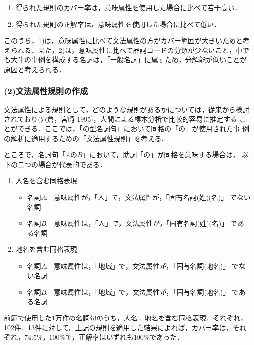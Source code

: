\begin{enumerate}
 \item 得られた規則のカバー率は，意味属性を使用した場合に比べて若干高い．
 \item 得られた規則の正解率は，意味属性を使用した場合に比べて低い．
\end{enumerate}\vspace{\baselineskip}

このうち，1)は，意味属性に比べて文法属性の方がカバー範囲が大きいためと考
えられる．また，2)は，意味属性に比べて品詞コードの分類が少ないこと，中で
も大半の事例を構成する名詞は，「一般名詞」に属すため，分解能が低いことが
原因と考えられる．
\subsubsection*{(2)文法属性規則の作成}

文法属性による規則として，どのような規則があるかについては，従来から検討
されており(穴倉，宮崎 1995)，人間による標本分析で比較的容易に推定する
ことができる．ここでは，「の型名詞句」において同格の「の」が使用された事
例の解析に適用するための「文法属性規則」を考える．

ところで，名詞句「$AのB$」において，助詞「の」が同格を意味する場合は，
以下の二つの場合が代表的である．
\renewcommand{\labelenumi}{}
\renewcommand{\labelitemi}{}
\begin{enumerate}
 \item 人名を含む同格表現
  \begin{itemize}
   \item 名詞$A$: \ 意味属性が，「人」で，文法属性が，「固有名詞(姓)(名)」
	 でない名詞
   \item 名詞$B$: \ 意味属性は，「人」で，文法属性が，「固有名詞(姓)(名)」
	 である名詞 
  \end{itemize}
  \item 地名を含む同格表現
  \begin{itemize}
   \item 名詞$A$: \ 意味属性は，「地域」で，文法属性が，「固有名詞(地名)」
	 でない名詞
   \item 名詞$B$: \ 意味属性は，「地域」で，文法属性が，「固有名詞(地名)」
	 である名詞
  \end{itemize}
\end{enumerate}\vspace{\baselineskip}

前節で使用した1万件の名詞句のうち，人名，地名を含む同格表現，それぞれ，
102件，13件に対して，上記の規則を適用した結果によれば，カバー率は，それ
ぞれ，$74.5\%$，$100\%$で，正解率はいずれも$100\%$であった．
